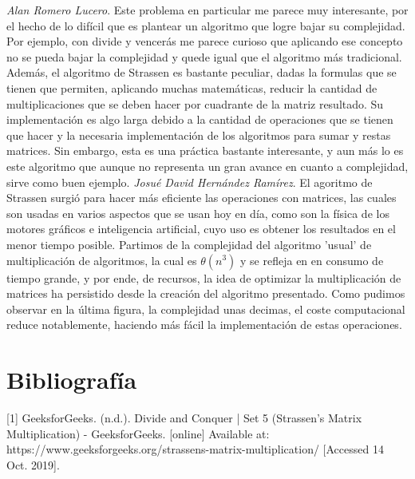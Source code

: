 \documentclass[12pt,twoside]{article}
\begin{document}
\textit{Alan Romero Lucero}. Este problema en particular me parece muy interesante, por el hecho de lo dif\'icil que es plantear un algoritmo que logre bajar su complejidad. Por ejemplo, con divide y vencer\'as me parece curioso que aplicando ese concepto no se pueda bajar la complejidad y quede igual que el algoritmo m\'as tradicional. Adem\'as, el algoritmo de Strassen es bastante peculiar, dadas la formulas que se tienen que permiten, aplicando muchas matem\'aticas, reducir la cantidad de multiplicaciones que se deben hacer por cuadrante de la matriz resultado. Su implementaci\'on es algo larga debido a la cantidad de operaciones que se tienen que hacer y la necesaria implementaci\'on de los algoritmos para sumar y restas matrices. Sin embargo, esta es una pr\'actica bastante interesante, y aun m\'as lo es este algoritmo que aunque no representa un gran avance en cuanto a complejidad, sirve como buen ejemplo.
\newline \newline
\textit{Josu\'e David Hern\'andez Ram\'irez}.
\newline \newline
El agoritmo de Strassen surgi\'o para hacer m\'as eficiente las operaciones con matrices, las cuales son usadas en varios aspectos que se usan hoy en d\'ia, como son la f\'isica de los motores gr\'aficos e inteligencia artificial, cuyo uso es obtener los resultados en el menor tiempo posible.
\newline \newline
Partimos de la complejidad del algoritmo 'usual' de multiplicaci\'on de algoritmos, la cual es $\theta(n^{3})$ y se refleja en en consumo de tiempo grande, y por ende, de recursos, la idea de optimizar la multiplicaci\'on de matrices ha persistido desde la creaci\'on del algoritmo presentado.
\newline
Como pudimos observar en la \'ultima figura, la complejidad unas decimas, el coste computacional reduce notablemente, haciendo m\'as f\'acil la implementaci\'on de estas operaciones.

\section{Bibliograf\'ia}
[1] GeeksforGeeks. (n.d.). Divide and Conquer | Set 5 (Strassen's Matrix Multiplication) - GeeksforGeeks. [online] Available at: https://www.geeksforgeeks.org/strassens-matrix-multiplication/ [Accessed 14 Oct. 2019].
\end{document}
